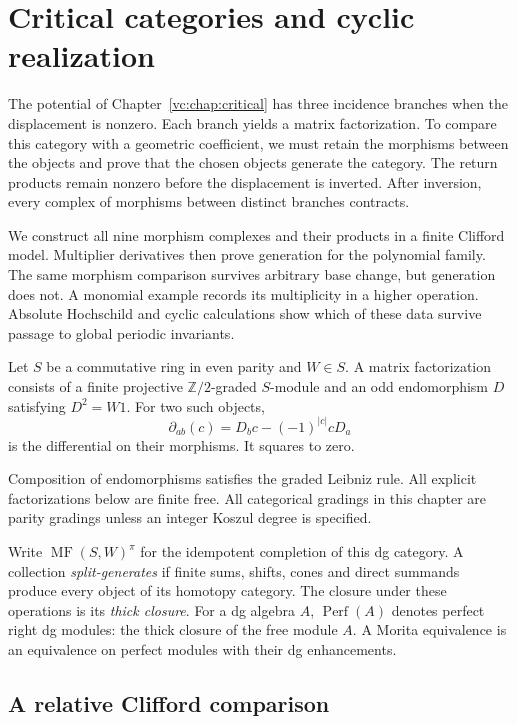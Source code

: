 \chapter{Critical categories and cyclic realization}
\label{mc:chap:categories}

The potential of Chapter~\ref{vc:chap:critical} has three
incidence branches when the displacement is nonzero.
Each branch yields a matrix factorization.
To compare this category with a geometric coefficient,
we must retain the morphisms between the objects and
prove that the chosen objects generate the category.
The return products remain nonzero before the displacement
is inverted. After inversion, every complex of morphisms
between distinct branches contracts.

We construct all nine morphism complexes and their products
in a finite Clifford model. Multiplier derivatives then
prove generation for the polynomial family. The same
morphism comparison survives arbitrary base change,
but generation does not. A monomial example records its
multiplicity in a higher operation. Absolute Hochschild
and cyclic calculations show which of these data survive
passage to global periodic invariants.

Let $S$ be a commutative ring in even parity and $W\in S$.
A matrix factorization consists of a finite projective
$\mathbb Z/2$-graded $S$-module and an odd endomorphism $D$
satisfying $D^2=W1$. For two such objects,
\[
 \partial_{ab}(c)=D_bc-(-1)^{|c|}cD_a
\]
is the differential on their morphisms. It squares to zero.

Composition of endomorphisms satisfies the graded Leibniz
rule. All explicit factorizations below are finite free.
All categorical gradings in this chapter are parity
gradings unless an integer Koszul degree is specified.

Write $\operatorname{MF}(S,W)^\pi$ for the idempotent
completion of this dg category. A collection
\emph{split-generates} if finite sums, shifts, cones and
direct summands produce every object of its homotopy
category. The closure under these operations is its
\emph{thick closure}. For a dg algebra $A$,
$\operatorname{Perf}(A)$ denotes perfect right dg modules:
the thick closure of the free module $A$.
A Morita equivalence is an equivalence on perfect modules
with their dg enhancements.

\section{A relative Clifford comparison}

